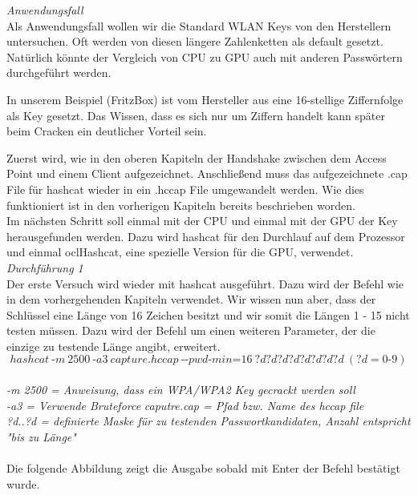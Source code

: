 \textit{Anwendungsfall}\\

Als Anwendungsfall wollen wir die Standard WLAN Keys von den Herstellern untersuchen. Oft werden von diesen längere Zahlenketten als default gesetzt. Natürlich könnte der Vergleich von CPU zu GPU auch mit anderen Passwörtern durchgeführt werden. 

In unserem Beispiel (FritzBox) ist vom Hersteller aus eine 16-stellige Ziffernfolge als Key gesetzt. Das Wissen, dass es sich nur um Ziffern handelt kann später beim Cracken ein deutlicher Vorteil sein.

Zuerst wird, wie in den oberen Kapiteln der Handshake zwischen dem Access Point und einem Client aufgezeichnet. Anschließend muss das aufgezeichnete .cap File für hashcat wieder in ein .hccap File umgewandelt werden. Wie dies funktioniert ist in den vorherigen Kapiteln bereits beschrieben worden. \\

Im nächsten Schritt soll einmal mit der CPU und einmal mit der GPU der Key herausgefunden werden. Dazu wird hashcat für den Durchlauf auf dem Prozessor und einmal oclHashcat, eine spezielle Version für die GPU, verwendet.\\ 

\textit{Durchführung 1}\\

Der erste Versuch wird wieder mit hashcat ausgeführt. Dazu wird der Befehl wie in dem vorhergehenden Kapiteln verwendet. Wir wissen nun aber, dass der Schlüssel eine Länge von 16 Zeichen besitzt und wir somit die Längen 1 - 15 nicht testen müssen. Dazu wird der Befehl um einen weiteren Parameter, der die einzige zu testende Länge angibt, erweitert.
$$hashcat~\text{-}m~2500~\text{-}a3~capture.hccap~\text{-}\text{-}pwd\text{-}min\text{=}16~?d?d?d?d?d?d?d?d~(?d = 0\text{-}9)$$\\

\textit{-m 2500 = Anweisung, dass ein WPA/WPA2 Key gecrackt werden soll}\\
\textit{-a3 = Verwende Bruteforce}
\textit{caputre.cap = Pfad bzw. Name des hccap file}\\
\textit{?d..?d = definierte Maske für zu testenden Passwortkandidaten, Anzahl entspricht "bis zu Länge"\\}\\


Die folgende Abbildung zeigt die Ausgabe sobald mit Enter der Befehl bestätigt wurde.\\


